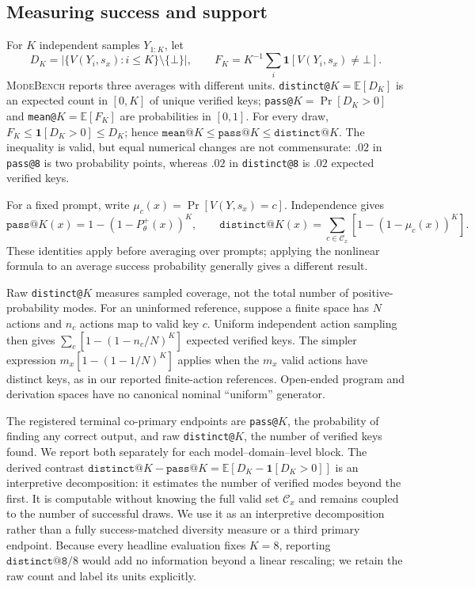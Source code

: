 \documentclass{article}
\newcommand{\1}{\mathbf 1}
\newcommand{\E}{\mathbb E}
\newcommand{\mb}{\textsc{ModeBench}}
\theoremstyle{remark}
\theoremstyle{definition}
\theoremstyle{plain}
\begin{document}
\subsection{Measuring success and support}
\label{sec:collapse-metrics}

For $K$ independent samples $Y_{1:K}$, let
\[
  D_K=\bigl|\{V(Y_i,s_x):i\le K\}\setminus\{\bot\}\bigr|,
  \qquad
  F_K=K^{-1}\sum_i \1[V(Y_i,s_x)\neq\bot].
\]
\mb{} reports three averages with different units. \texttt{distinct@}$K
=\E[D_K]$ is an expected count in $[0,K]$ of unique verified keys;
\texttt{pass@}$K=\Pr[D_K>0]$ and \texttt{mean@}$K=\E[F_K]$ are probabilities
in $[0,1]$. For every draw, $F_K\le\1[D_K>0]\le D_K$; hence
$\texttt{mean@}K\le\texttt{pass@}K\le\texttt{distinct@}K$. The inequality is
valid, but equal numerical changes are not commensurate: $.02$ in
\texttt{pass@8} is two probability points, whereas $.02$ in
\texttt{distinct@8} is $.02$ expected verified keys.

For a fixed prompt, write $\mu_c(x)=\Pr[V(Y,s_x)=c]$. Independence gives
\[
 \texttt{pass@}K(x)=1-(1-P_\theta^+(x))^K,\qquad
 \texttt{distinct@}K(x)=\sum_{c\in\mathcal C_x}[1-(1-\mu_c(x))^K].
\]
These identities apply before averaging over prompts; applying the nonlinear
formula to an average success probability generally gives a different result.

Raw \texttt{distinct@}$K$ measures sampled coverage, not the total number of
positive-probability modes. For an uninformed reference, suppose a finite
space has $N$ actions and $n_c$ actions map to valid key $c$. Uniform independent
action sampling then gives $\sum_c[1-(1-n_c/N)^K]$ expected verified keys.
The simpler expression $m_x[1-(1-1/N)^K]$ applies when the $m_x$ valid actions
have distinct keys, as in our reported finite-action references.
Open-ended program and derivation spaces have no canonical nominal
``uniform'' generator.

The registered terminal co-primary endpoints are \texttt{pass@}$K$, the
probability of finding any correct output, and raw \texttt{distinct@}$K$, the
number of verified keys found. We report both separately for each
model--domain--level block. The derived contrast
$\texttt{distinct@}K-\texttt{pass@}K
=\E[D_K-\1[D_K>0]]$ is an interpretive decomposition: it estimates the
number of verified modes beyond the first. It is computable without knowing the
full valid set $\mathcal C_x$ and remains coupled to the number of successful
draws. We use it as an interpretive decomposition rather than a fully
success-matched diversity measure or a third primary endpoint. Because every
headline evaluation fixes $K=8$, reporting $\texttt{distinct@8}/8$ would add no
information beyond a linear rescaling; we retain the raw count and label its
units explicitly.
\end{document}
